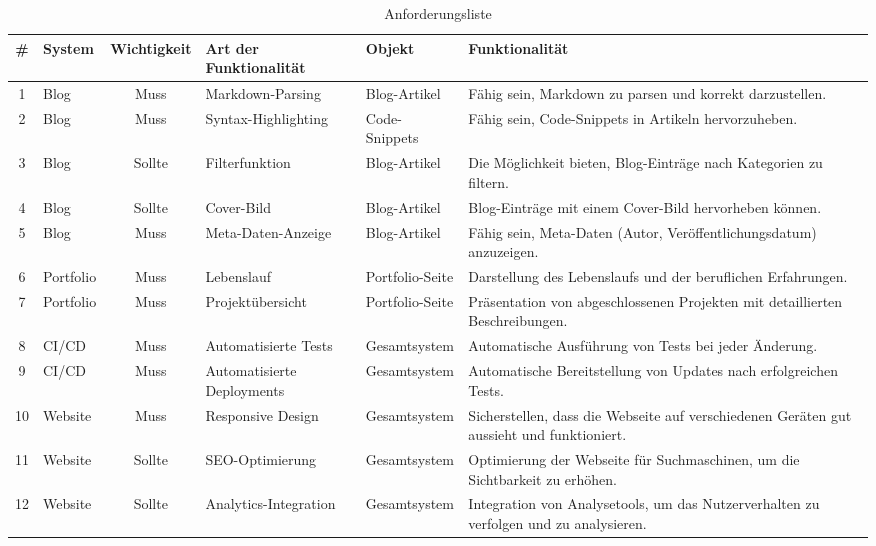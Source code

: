 \begin{landscape}
    \begin{table}[h!]
        \centering
        \begin{tabular}{|c|l|c|l|l|p{6cm}|}
        \hline
        \# & System    & Wichtigkeit & Art der Funktionalität       & Objekt           & Funktionalität                                                    \\ \hline
        1  & Blog      & Muss        & Markdown-Parsing             & Blog-Artikel     & Fähig sein, Markdown zu parsen und korrekt darzustellen.          \\ \hline
        2  & Blog      & Muss        & Syntax-Highlighting          & Code-Snippets    & Fähig sein, Code-Snippets in Artikeln hervorzuheben.              \\ \hline
        3  & Blog      & Sollte      & Filterfunktion               & Blog-Artikel     & Die Möglichkeit bieten, Blog-Einträge nach Kategorien zu filtern. \\ \hline
        4  & Blog      & Sollte      & Cover-Bild                   & Blog-Artikel     & Blog-Einträge mit einem Cover-Bild hervorheben können.            \\ \hline
        5  & Blog      & Muss        & Meta-Daten-Anzeige           & Blog-Artikel     & Fähig sein, Meta-Daten (Autor, Veröffentlichungsdatum) anzuzeigen.\\ \hline
        6  & Portfolio & Muss        & Lebenslauf                   & Portfolio-Seite  & Darstellung des Lebenslaufs und der beruflichen Erfahrungen.      \\ \hline
        7  & Portfolio & Muss        & Projektübersicht             & Portfolio-Seite  & Präsentation von abgeschlossenen Projekten mit detaillierten Beschreibungen. \\ \hline
        8  & CI/CD     & Muss        & Automatisierte Tests         & Gesamtsystem     & Automatische Ausführung von Tests bei jeder Änderung.             \\ \hline
        9  & CI/CD     & Muss        & Automatisierte Deployments   & Gesamtsystem     & Automatische Bereitstellung von Updates nach erfolgreichen Tests. \\ \hline
        10 & Website   & Muss        & Responsive Design            & Gesamtsystem     & Sicherstellen, dass die Webseite auf verschiedenen Geräten gut aussieht und funktioniert. \\ \hline
        11 & Website   & Sollte      & SEO-Optimierung              & Gesamtsystem     & Optimierung der Webseite für Suchmaschinen, um die Sichtbarkeit zu erhöhen. \\ \hline
        12 & Website   & Sollte      & Analytics-Integration        & Gesamtsystem     & Integration von Analysetools, um das Nutzerverhalten zu verfolgen und zu analysieren. \\ \hline
        \end{tabular}
        \caption{Anforderungsliste}
        \label{table:anforderungsliste}
        \end{table}

        
\end{landscape}


